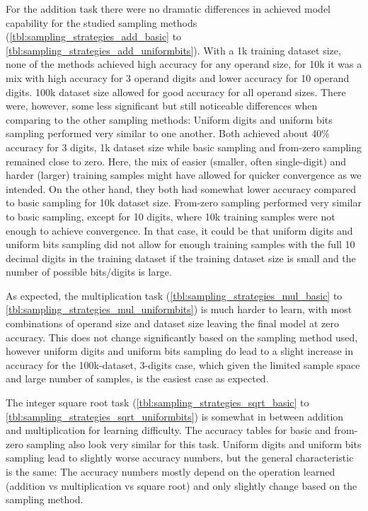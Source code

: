 For the addition task there were no dramatic differences in achieved model capability for the studied sampling methods  (\cref{tbl:sampling_strategies_add_basic} to \cref{tbl:sampling_strategies_add_uniformbits}). With a 1k training dataset size, none of the methods achieved high accuracy for any operand size, for 10k it was a mix with high accuracy for 3 operand digits and lower accuracy for 10 operand  digits. 100k dataset size allowed for good accuracy for all operand sizes.
There were, however, some less significant but still noticeable differences when comparing to the other sampling methods: Uniform digits and uniform bits sampling performed very similar to one another. Both achieved about 40\% accuracy for 3 digits, 1k dataset size while basic sampling and from-zero sampling remained close to zero. Here, the mix of easier (smaller, often single-digit) and harder (larger) training samples might have allowed for quicker convergence as we intended. On the other hand, they both had somewhat lower accuracy compared to basic sampling for 10k dataset size. From-zero sampling performed very similar to basic sampling,  except for 10 digits, where 10k training samples were not enough to achieve convergence. In that case, it could be that uniform digits and uniform bits sampling did not allow for enough training samples with the full 10 decimal digits in the training dataset if the training dataset size is small and the number of possible bits/digits is large.


As expected, the multiplication task (\cref{tbl:sampling_strategies_mul_basic} to \cref{tbl:sampling_strategies_mul_uniformbits}) is much harder to learn, with most combinations of operand size and dataset size leaving the final model at zero accuracy. This does not change significantly based on the sampling method used, however uniform digits and uniform bits sampling do lead to a  slight increase in accuracy for the 100k-dataset, 3-digits case, which given the limited sample space and large number of samples, is the easiest case as expected.

The integer square root task (\cref{tbl:sampling_strategies_sqrt_basic} to \cref{tbl:sampling_strategies_sqrt_uniformbits}) is somewhat in between addition and multiplication  for learning difficulty. The accuracy tables for basic and from-zero sampling also look very similar for this task.  Uniform digits and uniform bits sampling lead to slightly worse accuracy numbers, but the general characteristic is the same: The accuracy numbers mostly depend on the operation learned (addition vs multiplication vs square root) and only slightly change based on the sampling method.


